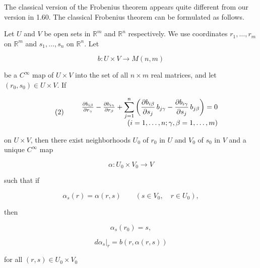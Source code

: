 \begin{remarks}\label{thm:1.61}
	The classical version of the Frobenius theorem appears quite different from our version in 1.60. The classical Frobenius theorem can be formulated as follows.

	Let $U$ and $V$ be open sets in $\mathbb{R}^m$ and $\mathbb{R}^n$ respectively. We use coordinates $r_1, \ldots, r_m$ on $\mathbb{R}^m$ and $s_1, \ldots, s_n$ on $\mathbb{R}^n$. Let

	\begin{equation}
		\tag{1}\label{eq:1.61:1}
		b\colon U\times V\to M(n,m)
	\end{equation}

	be a $C^{\infty}$ map of $U\times V$ into the set of all $n\times m$ real matrices, and let $(r_{0},s_{0})\in U\times V$. If

	\begin{equation}
		\tag{2}\label{eq:1.61:2}
		\begin{array}{r l r}&{}&{\frac{\partial b_{i\beta}}{\partial r_{\gamma}}-\frac{\partial b_{i\gamma}}{\partial r_{\beta}}+\displaystyle\sum_{j=1}^{n}\left(\frac{\partial b_{i\beta}}{\partial s_{j}}\,b_{j\gamma}-\frac{\partial b_{i\gamma}}{\partial s_{j}}\,b_{j\beta}\right)=0}\\ &{}&{(i=1,\ldots,n;\gamma,\beta=1,\ldots,m)}\end{array}
	\end{equation}

	on $U\times V$, then there exist neighborhoods $U_{0}$ of $r_{0}$ in $U$ and $V_{0}$ of $s_{0}$ in $V$ and a unique $C^{\infty}$ map

	\begin{equation}
		\tag{3}\label{eq:1.61:3}
		\alpha\colon U_{0}\times V_{0}\to V
	\end{equation}

	such that if

	\[
		\alpha_{s}(r)=\alpha(r,s)\qquad(s\in V_{0},\quad r\in U_{0}),
	\]

	then

	\begin{equation}
		\tag{4}\label{eq:1.61:4}
		\alpha_{s}(r_{0})=s,
	\end{equation}

	\[
		d\alpha_{s}|_{r}=b(r,\alpha(r,s))
	\]

	for all  $ (r,s)\in U_{0}\times V_{0} $


\end{remarks}
